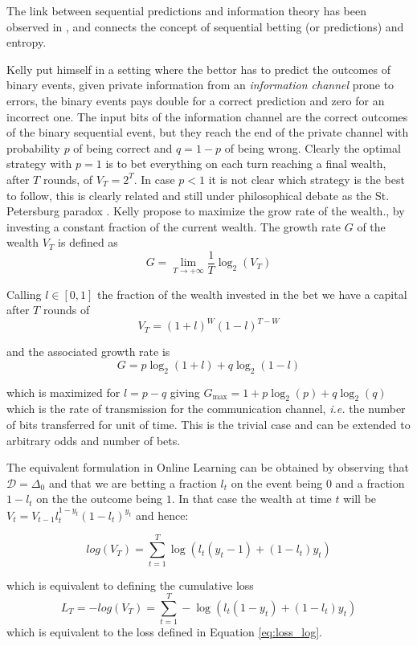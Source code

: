 The link between sequential predictions and information theory has been observed in \cite{kelly2011new}, and connects the concept of sequential betting (or predictions) and entropy.

Kelly put himself in a setting where the bettor has to predict the outcomes of binary events, given private information from an \emph{information channel} prone to errors, the binary events pays double for a correct prediction and zero for an incorrect one. The input bits of the information channel are the correct outcomes of the binary sequential event, but they reach the end of the private channel with probability $p$ of being correct and $q=1-p$ of being wrong. Clearly the optimal strategy with $p=1$ is to bet everything on each turn reaching a final wealth, after $T$ rounds, of $V_T=2^T$. In case $p<1$ it is not clear which strategy is the best to follow, this is clearly related and still under philosophical debate as the St. Petersburg paradox \cite{samuelson1977st}. Kelly propose to maximize the grow rate of the wealth., by investing a constant fraction of the current wealth. The growth rate $G$ of the wealth $V_T$ is defined as 
$$G=\lim\limits_{T\to+\infty}\frac{1}{T}\log_2(V_T)$$

Calling $l\in[0,1]$ the fraction of the wealth invested in the bet we have a capital after $T$ rounds of 
$$V_T=(1+l)^{W}(1-l)^{T-W}$$ 

and the associated growth rate is 
$$G=p\log_2(1+l)+q\log_2(1-l)$$

which is maximized for $l=p-q$ giving $G_{\max}=1+p\log_2(p)+q\log_2(q)$ which is the rate of transmission for the communication channel, \emph{i.e.} the number of bits transferred for unit of time. This is the trivial case and can be extended to arbitrary odds and number of bets.

The equivalent formulation in Online Learning can be obtained by observing that $\mathcal D=\Delta_0$ and that we are betting a fraction $l_t$ on the event being $0$ and a fraction $1-l_t$ on the the outcome being $1$. In that case the wealth at time $t$ will be $V_t=V_{t-1}l_t^{1-y_t}(1-l_t)^{y_t}$ and hence: 

\begin{equation}
log(V_T)=\sum\limits_{t=1}^T\log(l_t(y_t-1)+(1-l_t)y_t)
\end{equation}

which is equivalent to defining the cumulative loss 
$$L_T=-log(V_T)=\sum\limits_{t=1}^T-\log(l_t(1-y_t)+(1-l_t)y_t)$$
which is equivalent to the loss defined in Equation \eqref{eq:loss_log}.


